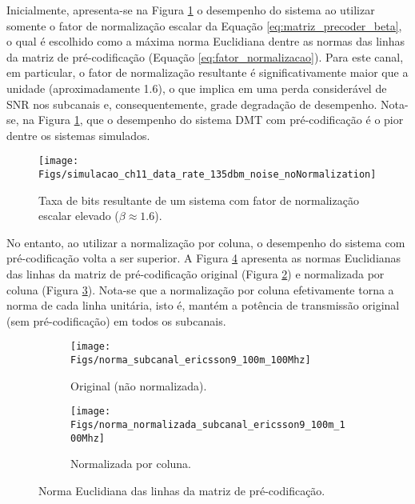 Inicialmente, apresenta-se na Figura \ref{fig:simulacao_ch11_data_rate_135dbm_noise_noNormalization} o desempenho do sistema ao utilizar somente o fator de normalização escalar da Equação \ref{eq:matriz_precoder_beta}, o qual é escolhido como a máxima norma Euclidiana dentre as normas das linhas da matriz de pré-codificação (Equação \ref{eq:fator_normalizacao}). Para este canal, em particular, o fator de normalização resultante é significativamente maior que a unidade (aproximadamente 1.6), o que implica em uma perda considerável de SNR nos subcanais e, consequentemente, grade degradação de desempenho. Nota-se, na Figura \ref{fig:simulacao_ch11_data_rate_135dbm_noise_noNormalization}, que o desempenho do sistema DMT com pré-codificação é o pior dentre os sistemas simulados.

\begin{figure}[htbp]
\centering
\texttt{[image: Figs/simulacao\_ch11\_data\_rate\_135dbm\_noise\_noNormalization]}
\caption{ Taxa de bits resultante de um sistema com fator de normalização escalar elevado ($\beta \approx 1.6$). \label{fig:simulacao_ch11_data_rate_135dbm_noise_noNormalization}}
\end{figure}

No entanto, ao utilizar a normalização por coluna, o desempenho do sistema com pré-codificação volta a ser superior. A Figura \ref{fig:normas_ericsson9_100m_100Mhz} apresenta as normas Euclidianas das linhas da matriz de pré-codificação original (Figura \ref{fig:norma_subcanal_ericsson9_100m_100Mhz}) e normalizada por coluna (Figura \ref{fig:norma_normalizada_subcanal_ericsson9_100m_100Mhz}). Nota-se que a normalização por coluna efetivamente torna a norma de cada linha unitária, isto é, mantém a potência de transmissão original (sem pré-codificação) em todos os subcanais.

\begin{figure}[htbp]
\centering
	\begin{subfigure}[b]{0.49\textwidth}
		\texttt{[image: Figs/norma\_subcanal\_ericsson9\_100m\_100Mhz]}
		\caption{Original (não normalizada).}
		\label{fig:norma_subcanal_ericsson9_100m_100Mhz}
	\end{subfigure}
	\begin{subfigure}[b]{0.49\textwidth}
		\centering
		\texttt{[image: Figs/norma\_normalizada\_subcanal\_ericsson9\_100m\_100Mhz]}
		\caption{Normalizada por coluna.}
		\label{fig:norma_normalizada_subcanal_ericsson9_100m_100Mhz}
	\end{subfigure}
\caption{ Norma Euclidiana das linhas da matriz de pré-codificação.}
\label{fig:normas_ericsson9_100m_100Mhz}
\end{figure}


